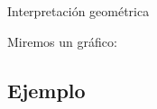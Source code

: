 \documentclass[xcolor=svgnames]{beamer} %
\theoremstyle{plain}
\theoremstyle{definition}
\begin{document}
\begin{frame}{Interpretación geométrica}


  Miremos un gráfico:
  \begin{center}
  \end{center}
\end{frame} 



\subsection{Ejemplo}
\end{document}
